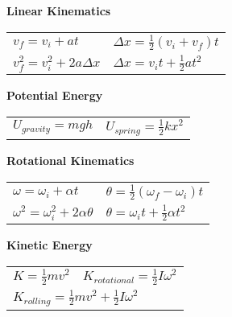 \documentclass[12pt]{article}
\begin{document}
\null\vspace{20pt}
%
%
\begin{minipage}[t]{.5\textwidth}
\textbf{Linear Kinematics} \\[8pt]
	\begin{tabular}{p{3cm} p{6cm}}
	$v_f = v_i + at$ & \hspace{12pt} $\Delta x = \tfrac{1}{2}(v_i + v_f)t$\\[6pt]
	$v_f^2 = v_i^2 + 2a \Delta x$ & \hspace{12pt} $\Delta x = v_i t + \tfrac{1}{2} at^2$\\[12pt]
	\end{tabular}
\end{minipage}
%
%
\vspace{12pt}
\begin{minipage}[t]{.5\textwidth}
\textbf{Potential Energy} \\[6pt]
	\begin{tabular}{p{3cm} p{6cm}}
	$U_{gravity} = mgh$ & $U_{spring} = \tfrac{1}{2} kx^2$ \\[12pt]
	\end{tabular}
\end{minipage}

%
%
\begin{minipage}[t]{.5\textwidth}
\textbf{Rotational Kinematics} \\[8pt]
	\begin{tabular}{p{3cm} p{6cm}}
	$\omega = \omega_i +\alpha t$ & \hspace{12pt} $\theta = \tfrac{1}{2} (\omega_f - \omega_i) t$ \\[6pt]
	$\omega^2 = \omega_i^2 + 2\alpha \theta$ & \hspace{12pt} $\theta = \omega_i t + \tfrac{1}{2} \alpha t^2$ \\
	\end{tabular}
\end{minipage}
%
%
\begin{minipage}[t]{.5\textwidth}
\textbf{Kinetic Energy} \\[6pt]
	\begin{tabular}{p{3cm} p{6cm}}
	$K = \tfrac{1}{2}mv^2$ & $K_{rotational} = \tfrac{1}{2} I \omega^2$ \\[6pt]
	\multicolumn{2}{l}{	
	$K_{rolling} = \tfrac{1}{2}mv^2 + \tfrac{1}{2}I\omega^2$} \\[12pt]
	\end{tabular}
\end{minipage}
\vspace{12pt}
\end{document}
